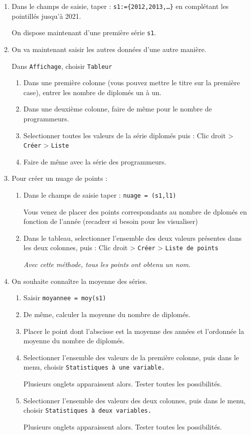 \begin{enumerate}
	\item Dans le champs de saisie, taper : \texttt{s1:=\{2012,2013,\dots\}} en complétant les pointillés jusqu'à 2021.
	
	On dispose maintenant d'une première série \texttt{s1}.
	\item On va maintenant saisir les autres données d'une autre manière.
	
	Dans \texttt{Affichage}, choisir \texttt{Tableur}
	
	\begin{enumerate}
		\item Dans une première colonne (vous pouvez mettre le titre sur la première case), entrer les nombre de diplomés un à un.
		
		\item Dans une deuxième colonne, faire de même pour le nombre de programmeurs.
		
		\item Selectionner toutes les valeurs de la série diplomés puis : Clic droit > \texttt{Créer} > \texttt{Liste}
		\item Faire de même avec la série des programmeurs.
	\end{enumerate}
	\item Pour créer un nuage de points :
	
	\begin{enumerate}
		\item Dans le champs de saisie taper : \texttt{nuage = (s1,l1)}
		
		Vous venez de placer des points correspondants au nombre de dplomés en fonction de l'année (recadrer si besoin pour les visualiser)
		\item Dans le tableau, selectionner l'ensemble des deux valeurs présentes dans les deux colonnes, puis : Clic droit > \texttt{Créer} > \texttt{Liste de points}
		
		{\it Avec cette méthode, tous les points ont obtenu un nom.}
	\end{enumerate}
	\item On souhaite connaître la moyenne des séries.
	
	\begin{enumerate}
		\item Saisir \texttt{moyannee = moy(s1)}
		\item De même, calculer la moyenne du nombre de diplomés.
		\item Placer le point dont l'abscisse est la moyenne des années et l'ordonnée la moyenne du nombre de diplomés.
		\item Selectionner l'ensemble des valeurs de la première colonne, puis dans le menu, choisir \texttt{Statistiques à une variable.}
		
		Plusieurs onglets apparaissent alors. Tester toutes les possibilités.
		\item Selectionner l'ensemble des valeurs des deux colonnes, puis dans le menu, choisir \texttt{Statistiques à deux variables.}
		
		Plusieurs onglets apparaissent alors. Tester toutes les possibilités.
	\end{enumerate}
\end{enumerate}




